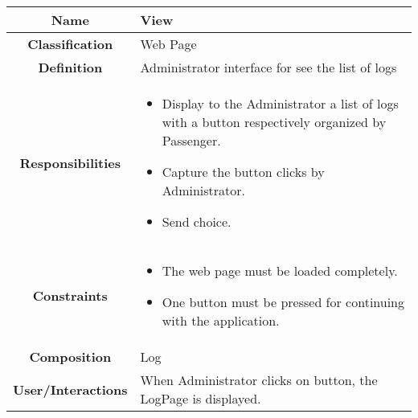 \documentclass[11pt, a4paper,titlepage]{article}
\begin{document}
\begin{enumerate}
\begin{tabularx}{\textwidth}{| c | X |}
	\hline
	\textbf{Name} & 
	View
	\\
	\hline
	\textbf{Classification} & 
	Web Page
	\\
	\hline
	\textbf{Definition} & 
	Administrator interface for see the list of logs\\
	\hline
	\textbf{Responsibilities} &
	\begin{itemize}
		\item Display to the Administrator a list of logs with a button respectively organized by Passenger.
		\item  Capture the button clicks by Administrator.
		\item Send choice.
	\end{itemize}
	\\
	\hline
	\textbf{Constraints} & 
	\begin{itemize}
		\item  The web page must be loaded completely.
		\item One button must be pressed for continuing with the application.
	\end{itemize}
	\\
	\hline
	\textbf{Composition} & 
	Log
	\\
	\hline
	\textbf{User/Interactions} & 
	When Administrator clicks on button, the LogPage is displayed.
	\\
	\hline	
\end{tabularx}


\end{enumerate}
\end{document}
